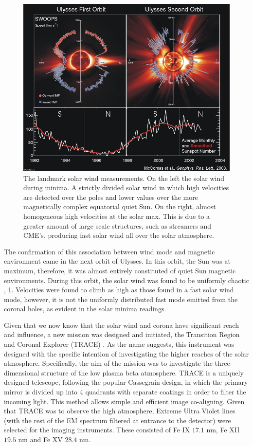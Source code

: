 \begin{figure}
	\includegraphics[scale=0.5]{Chapter1/Figs/ulysses_solar_wind}
	\caption{The landmark solar wind measurements. On the left the solar wind during minima. A strictly divided solar wind in which high velocities are detected over the poles and lower values over the more magnetically complex equatorial quiet Sun. On the right, almost homogeneous high velocities at the solar max. This is due to a greater amount of large scale structures, such as streamers and CME's, producing fast solar wind all over the solar atmosphere.
		\cite{McComas2003}}
	\label{fig:ulysses_sw}
\end{figure}

The confirmation of this association between wind mode and magnetic environment came in the next orbit of Ulysses.
In this orbit, the Sun was at maximum, therefore, it was almost entirely constituted of quiet Sun magnetic environments.
During this orbit, the solar wind was found to be uniformly chaotic , \ref{fig:ulysses_sw}.
Velocities were found to climb as high as those found in a fast solar wind mode, however, it is not the uniformly distributed fast mode emitted from the coronal holes, as evident in the solar minima readings.

Given that we now know that the solar wind and corona have significant reach and influence, a new mission was designed and initiated, the Transition Region and Coronal Explorer (TRACE) \cite{Gaeng1998}.
As the name suggests, this instrument was designed with the specific intention of investigating the higher reaches of the solar atmosphere.
Specifically, the aim of the mission was to investigate the three-dimensional structure of the low plasma beta atmosphere.
TRACE is a uniquely designed telescope, following the popular Cassegrain design, in which the primary mirror is divided up into 4 quadrants with separate coatings in order to filter the incoming light.
This method allows simple and efficient image co-aligning.
Given that TRACE was to observe the high atmosphere, Extreme Ultra Violet lines (with the rest of the EM spectrum filtered at entrance to the detector) were selected for the imaging instruments. 
These consisted of Fe IX $17.1$ nm, Fe XII $19.5$ nm and Fe XV $28.4$ nm.

